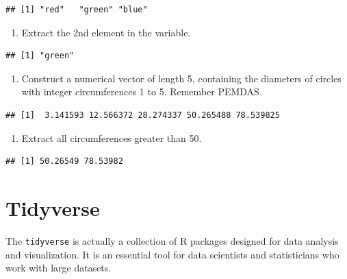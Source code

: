 \documentclass[
]{book}
\providecommand{\tightlist}{%
  \setlength{\itemsep}{0pt}\setlength{\parskip}{0pt}}
\begin{document}
\begin{verbatim}
## [1] "red"   "green" "blue"
\end{verbatim}

\begin{enumerate}
\def\labelenumi{\arabic{enumi}.}
\setcounter{enumi}{1}
\tightlist
\item
  Extract the 2nd element in the variable.
\end{enumerate}

\begin{verbatim}
## [1] "green"
\end{verbatim}

\begin{enumerate}
\def\labelenumi{\arabic{enumi}.}
\setcounter{enumi}{2}
\tightlist
\item
  Construct a numerical vector of length 5, containing the diameters of circles with integer circumferences 1 to 5. Remember PEMDAS.
\end{enumerate}

\begin{verbatim}
## [1]  3.141593 12.566372 28.274337 50.265488 78.539825
\end{verbatim}

\begin{enumerate}
\def\labelenumi{\arabic{enumi}.}
\setcounter{enumi}{3}
\tightlist
\item
  Extract all circumferences greater than 50.
\end{enumerate}

\begin{verbatim}
## [1] 50.26549 78.53982
\end{verbatim}

\hypertarget{tidyverse-1}{%
\chapter{Tidyverse}\label{tidyverse-1}}

The \texttt{tidyverse} is actually a collection of R packages designed for data analysis and visualization. It is an essential tool for data scientists and statisticians who work with large datasets.

\hfill\break
\end{document}
